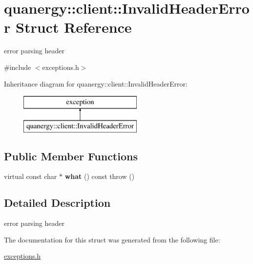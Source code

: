 \hypertarget{structquanergy_1_1client_1_1InvalidHeaderError}{\section{quanergy\-:\-:client\-:\-:Invalid\-Header\-Error Struct Reference}
\label{structquanergy_1_1client_1_1InvalidHeaderError}
}


error parsing header  




{\ttfamily \#include $<$exceptions.\-h$>$}

Inheritance diagram for quanergy\-:\-:client\-:\-:Invalid\-Header\-Error\-:\begin{figure}[H]
\begin{center}
\leavevmode
\includegraphics[height=2.000000cm]{structquanergy_1_1client_1_1InvalidHeaderError}
\end{center}
\end{figure}
\subsection*{Public Member Functions}
\begin{DoxyCompactItemize}
\item 
\hypertarget{structquanergy_1_1client_1_1InvalidHeaderError_a3e7c2a648f3e6b23556fe667407b0e4f}{virtual const char $\ast$ {\bfseries what} () const   throw ()}\label{structquanergy_1_1client_1_1InvalidHeaderError_a3e7c2a648f3e6b23556fe667407b0e4f}

\end{DoxyCompactItemize}


\subsection{Detailed Description}
error parsing header 

The documentation for this struct was generated from the following file\-:\begin{DoxyCompactItemize}
\item 
\hyperlink{exceptions_8h}{exceptions.\-h}\end{DoxyCompactItemize}
